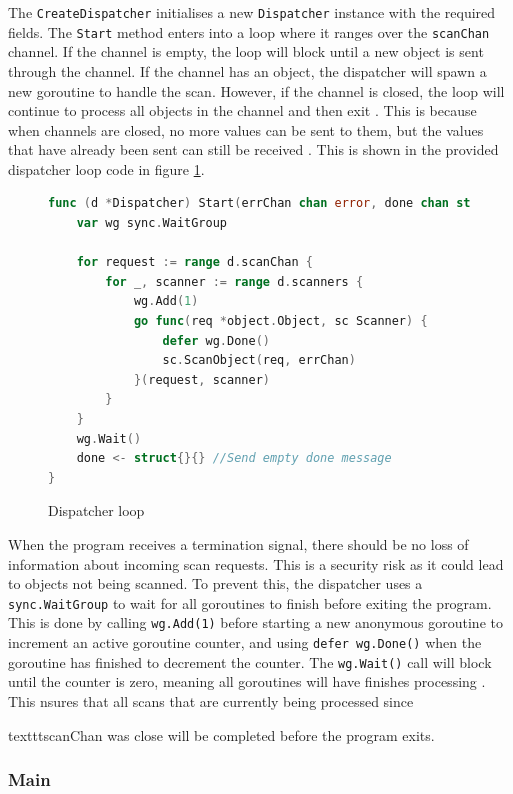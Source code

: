 \documentclass[12pt, conference, final, a4paper, onecolumn, compsoc]{IEEEtran}
\begin{document}
The \texttt{CreateDispatcher} initialises a new \texttt{Dispatcher} instance
with the required fields. The \texttt{Start} method enters into a loop where it
ranges over the \texttt{scanChan} channel. If the channel is empty, the loop
will block until a new object is sent through the channel. If the channel has an
object, the dispatcher will spawn a new goroutine to handle the scan. However,
if the channel is closed, the loop will continue to process all objects in the
channel and then exit \citep{go-channel-ranges}. This is because when channels
are closed, no more values can be sent to them, but the values that have already
been sent can still be received \citep{go-closing-channels}. This is shown in
the provided dispatcher loop code in figure \ref{fig:dispatcher-loop}.

\begin{figure}[H]
\begin{lstlisting}[language=Go]
func (d *Dispatcher) Start(errChan chan error, done chan struct{}) {
	var wg sync.WaitGroup

	for request := range d.scanChan {
		for _, scanner := range d.scanners {
			wg.Add(1)
			go func(req *object.Object, sc Scanner) {
				defer wg.Done()
				sc.ScanObject(req, errChan)
			}(request, scanner)
		}
	}
	wg.Wait()
	done <- struct{}{} //Send empty done message
}
\end{lstlisting}
  \caption{Dispatcher loop}
  \label{fig:dispatcher-loop}
\end{figure}

When the program receives a termination signal, there should be no loss of
information about incoming scan requests. This is a security risk as it could
lead to objects not being scanned. To prevent this, the dispatcher uses a
\texttt{sync.WaitGroup} to wait for all goroutines to finish before exiting the
program. This is done by calling \texttt{wg.Add(1)} before starting a new
anonymous goroutine to increment an active goroutine counter, and using
\texttt{defer wg.Done()} when the goroutine has finished to decrement the
counter. The \texttt{wg.Wait()} call will block until the counter is zero,
meaning all goroutines will have finishes processing \citep{go-waitgroups}. This
nsures that all scans that are currently being processed since

texttt{scanChan} was close will be completed before the program exits.

\subsubsection*{Main}
\end{document}
